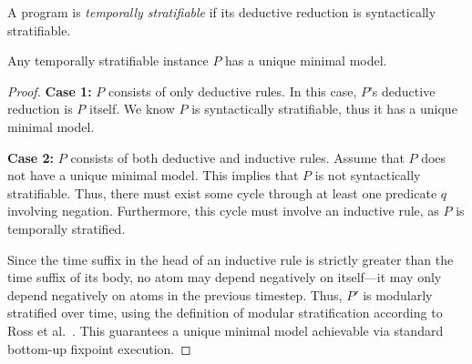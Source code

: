 \begin{definition} 
%
A \slang program is \emph{temporally stratifiable} if its deductive
reduction is syntactically stratifiable.
%
\end{definition}

\begin{lemma}
\label{lemma:temp-strat-uniq}
%
Any temporally stratifiable \slang instance $P$ has a unique minimal model.
%
\end{lemma} 

\begin{proof}
%
{\bf Case 1:} $P$ consists of only deductive rules.  In this case, $P$'s
deductive reduction is $P$ itself.  We know $P$ is syntactically stratifiable,
thus it has a unique minimal model.

{\bf Case 2:} $P$ consists of both deductive and inductive rules.  Assume that
$P$ does not have a unique minimal model.  This implies that $P$ is not
syntactically stratifiable.  Thus, there must exist some cycle through at least
one predicate $q$ involving negation.
Furthermore, this cycle must involve an inductive rule, as $P$ is temporally
stratified.

Since the time suffix in the head of an inductive rule is strictly greater than
the time suffix of its body, no atom may depend negatively on itself---it may
only depend negatively on atoms in the previous timestep.  Thus, $P'$ is
modularly stratified over time, using the definition of modular stratification
according to Ross et al.~\cite{modular}.  This guarantees a unique minimal model
achievable via standard bottom-up fixpoint execution.
%
%
\end{proof}


